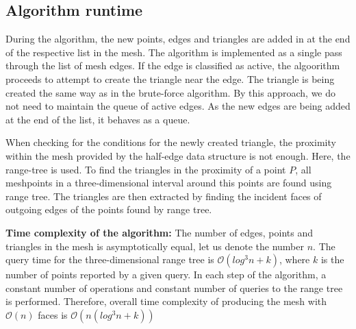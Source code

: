 \subsection{Algorithm runtime}
During the algorithm, the new points, edges and triangles are added in
at the end of the respective list in the mesh. 
The algorithm is implemented as a single pass through the list of 
mesh edges. 
If the edge is classified as active, the algoorithm proceeds 
to attempt to create the triangle near the edge. 
The triangle is being created the same way as in the brute-force
algorithm.
By this approach, we do not need to
maintain the queue of active edges. As the new edges are being added at 
the end of the list, it behaves as a queue.

When checking for the conditions for the newly created triangle, the 
proximity within the mesh provided by the half-edge data structure is
not enough. Here, the range-tree is used. To find the triangles in the
proximity of a point $P$, all meshpoints in a three-dimensional interval
around this points are found using range tree. The triangles are then 
extracted by finding the incident faces of outgoing edges of the points
found by range tree.

\textbf{Time complexity of the algorithm:}
The number of edges, points and triangles in the mesh is asymptotically 
equal, let us denote the number $n$. The query time for the three-dimensional 
range tree is $\mathcal{O}(log^3n+k)$, where $k$ is the number of points
reported by a given query. In each step of the algorithm, a constant number of
operations and constant number of queries to the range tree is performed.
Therefore, overall time complexity of producing the mesh with $\mathcal{O}(n)$
faces is $\mathcal{O}(n (log^3n+k))$